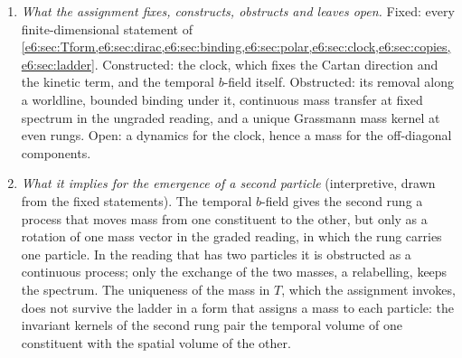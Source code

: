 \begin{remark}
\begin{enumerate}[label=(\alph*),leftmargin=2.2em]
by $Y\in\so3_+$ is $Y^{\!\top}K^a+K^aY=2Y(\hat n)\gamma^a$, with total weight $96|Y(\hat n)|^2$ (\cref{e6:prop:dirac}(i)). This is a quadratic form on $\so3_+$ with
kernel $\R J(\hat n)$, invariant under the stabiliser of the clock: an invariant statement of the breaking. It has the form of the adjoint-Higgs mass
term $g^2|[b,\langle\Phi\rangle]|^2$ of the Georgi--Glashow $SO(3)$ model \cite{GeorgiGlashowPRL72}, with the clock in the role of the Higgs vector
\cite{EnglertBrout64,Higgs64,Kibble67}: the two charge-flipping components would be massive and $J(\hat n)$ massless. That needs a clock field $\hat n(x)$ with a
covariant kinetic term, and the arena supplies none: a dynamics that selects the clock is open (\cref{r2:sec:main}). Gauge invariance forbids a
bare mass term (inherited), and the Dirac mass gives none, since $\so3_+$ preserves $T$ (\cref{e6:prop:Tform}). In \cref{d7:rem:verdict}(e) the rate matrix
played the role of the adjoint vacuum value; here the clock does. The pattern is that of an adjoint $SO(3)\to U(1)$ breaking, not of the electroweak $SU(2)_L\times U(1)_Y\to U(1)_{\rm em}$ by a doublet, and nothing here derives an electroweak Higgs mechanism.
\item \emph{What the assignment fixes, constructs, obstructs and leaves open.} Fixed: every finite-dimensional statement of
\cref{e6:sec:Tform,e6:sec:dirac,e6:sec:binding,e6:sec:polar,e6:sec:clock,e6:sec:copies,e6:sec:ladder}. Constructed: the clock, which fixes the Cartan
direction and the kinetic term, and the temporal $b$-field itself. Obstructed: its removal along a worldline, bounded binding under it, continuous mass
transfer at fixed spectrum in the ungraded reading, and a unique Grassmann mass kernel at even rungs. Open: a dynamics for the clock, hence a mass for the
off-diagonal components.
\item \emph{What it implies for the emergence of a second particle} (interpretive, drawn from the fixed statements). The temporal $b$-field gives the
second rung a process that moves mass from one constituent to the other, but only as a rotation of one mass vector in the graded reading, in which
the rung carries one particle. In the reading that has two particles it is obstructed as a continuous process; only
the exchange of the two masses, a relabelling, keeps the spectrum. The uniqueness of the mass in $T$, which the assignment invokes,
does not survive the ladder in a form that assigns a mass to each particle: the invariant kernels of the second rung pair the temporal volume of one
constituent with the spatial volume of the other.
\end{enumerate}
\end{remark}

